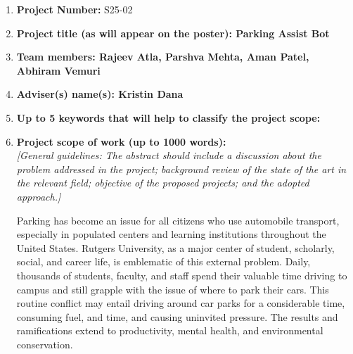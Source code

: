 \documentclass{article}
\begin{document}
\vspace{2em}
\begin{enumerate}[leftmargin=1.5cm]
    \item \textbf{\large Project Number:} S25-02\\
    
    \vspace{1em}

    \item \textbf{\large  Project title (as will appear on the poster): Parking Assist Bot} \\
    
    \vspace{1em}

    \item \textbf{\large Team members: Rajeev Atla, Parshva Mehta, Aman Patel, Abhiram Vemuri} \\
    
    \vspace{1em}

    \item \textbf{\large Adviser(s) name(s): Kristin Dana} \\
    
    \vspace{1em}

    \item \textbf{\large Up to 5 keywords that will help to classify the project scope:} \\
    
    \vspace{1em}

    \item \textbf{\large Project scope of work (up to 1000 words):} \\
    \textit{[General guidelines: The abstract should include a discussion about the problem addressed in the project; background review of the state of the art in the relevant field; objective of the proposed projects; and the adopted approach.]}
    
    Parking has become an issue for all citizens who use automobile transport, 
    especially in populated centers and learning institutions throughout the United States. 
    Rutgers University, 
    as a major center of student, 
    scholarly, 
    social, 
    and career life, 
    is emblematic of this external problem. Daily, thousands of students, faculty, and staff spend their valuable time driving to campus and still grapple with the issue of where to park their cars. This routine conflict may entail driving around car parks for a considerable time, consuming fuel, and time, and causing uninvited pressure. The results and ramifications extend to productivity, mental health, and environmental conservation.


\end{enumerate}
\end{document}
